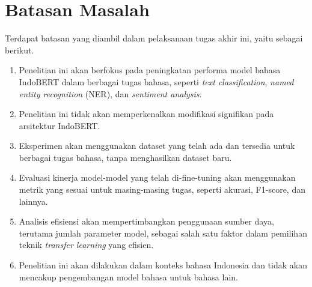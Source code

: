 \section{Batasan Masalah}
\label{sec:batasan-masalah}

Terdapat batasan yang diambil dalam pelaksanaan tugas akhir ini, yaitu sebagai berikut.

\begin{enumerate}
    \item Penelitian ini akan berfokus pada peningkatan performa model bahasa IndoBERT dalam berbagai tugas bahasa, seperti \textit{text classification},  \textit{named entity recognition} (NER), dan \textit{sentiment analysis}.
    \item Penelitian ini tidak akan memperkenalkan modifikasi signifikan pada arsitektur IndoBERT.
    \item Eksperimen akan menggunakan dataset yang telah ada dan tersedia untuk berbagai tugas bahasa, tanpa menghasilkan dataset baru.
    \item Evaluasi kinerja model-model yang telah di-fine-tuning akan menggunakan metrik yang sesuai untuk masing-masing tugas, seperti akurasi, F1-score, dan lainnya.
    \item Analisis efisiensi akan mempertimbangkan penggunaan sumber daya, terutama jumlah parameter model, sebagai salah satu faktor dalam pemilihan teknik \textit{transfer learning} yang efisien.
    \item Penelitian ini akan dilakukan dalam konteks bahasa Indonesia dan tidak akan mencakup pengembangan model bahasa untuk bahasa lain.
\end{enumerate}
